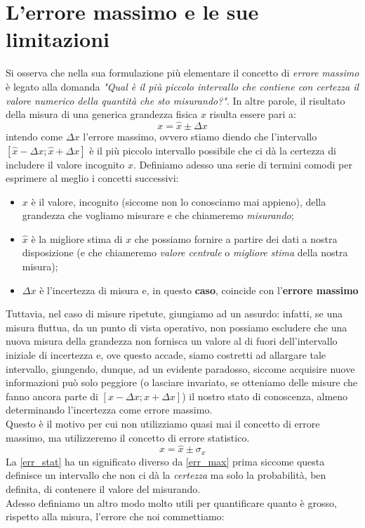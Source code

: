 \documentclass{report}
\begin{document}
	\section{L'errore massimo e le sue limitazioni}
	Si osserva che nella sua formulazione più elementare il concetto di \emph{errore massimo} è legato alla domanda \emph{"Qual è il più piccolo intervallo che contiene con certezza il valore numerico della quantità che sto misurando?"}. In altre parole, il risultato della misura di una generica grandezza fisica $x$ risulta essere pari a:
	\begin{equation}
		x = \hat{x} \pm \Delta x
		\label{err_max}
	\end{equation}
	intendo come $\Delta x$ l'errore massimo, ovvero stiamo diendo che l'intervallo $[\hat{x} - \Delta x; \hat{x} + \Delta x]$ è il più piccolo intervallo possibile che ci dà la certezza di includere il valore incognito $x$. Definiamo adesso una serie di termini comodi per esprimere al meglio i concetti successivi:
	\begin{itemize}
		\item $x$ è il valore, incognito (siccome non lo conosciamo mai appieno), della grandezza che vogliamo misurare e che chiameremo \emph{misurando};
		\item $\hat{x}$ è la migliore stima di $x$ che possiamo fornire a partire dei dati a nostra disposizione (e che chiameremo \emph{valore centrale} o \emph{migliore stima} della nostra misura);
		\item $\Delta x$ è l'incertezza di misura e, in questo \textbf{caso}, coincide con l'\textbf{errore massimo}
	\end{itemize}
	Tuttavia, nel caso di misure ripetute, giungiamo ad un assurdo: infatti, se una misura fluttua, da un punto di vista operativo, non possiamo escludere che una nuova misura della grandezza non fornisca un valore al di fuori dell'intervallo iniziale di incertezza e, ove questo accade, siamo costretti ad allargare tale intervallo, giungendo, dunque, ad un evidente paradosso, siccome acquisire nuove informazioni può solo peggiore (o lasciare invariato, se otteniamo delle misure che fanno ancora parte di $[x-\Delta x; x + \Delta x]$) il nostro stato di conoscenza, almeno determinando l'incertezza come errore massimo. \\
	Questo è il motivo per cui non utilizziamo quasi mai il concetto di errore massimo, ma utilizzeremo il concetto di errore statistico.
	\begin{equation}
		x = \hat{x} \pm \sigma_x
		\label{err_stat}
	\end{equation}
	La \ref{err_stat} ha un significato diverso da \ref{err_max} prima siccome questa definisce un intervallo che non ci dà la \emph{certezza} ma solo la probabilità, ben definita, di contenere il valore del misurando. \\
	Adesso definiamo un altro modo molto utili per quantificare quanto è grosso, rispetto alla misura, l'errore che noi commettiamo:
\end{document}
